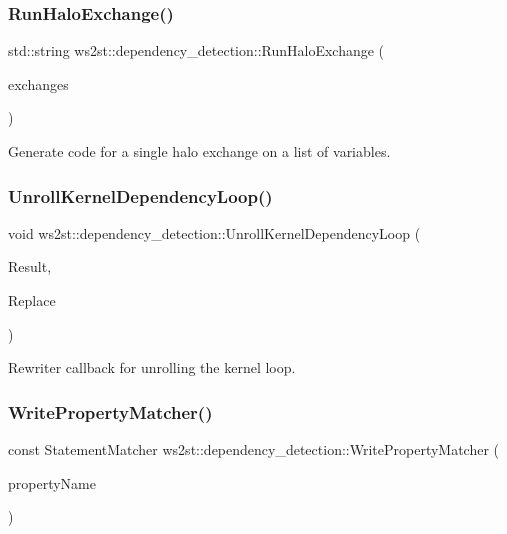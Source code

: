 \subsubsection{\texorpdfstring{Run\+Halo\+Exchange()}{RunHaloExchange()}}
{\footnotesize\ttfamily std\+::string ws2st\+::dependency\+\_\+detection\+::\+Run\+Halo\+Exchange (\begin{DoxyParamCaption}\item[{std\+::vector$<$ std\+::string $>$}]{exchanges }\end{DoxyParamCaption})}



Generate code for a single halo exchange on a list of variables. 

\mbox{\label{namespacews2st_1_1dependency__detection_a8b77ddddfc773081dd720230552c93c2}} 
\subsubsection{\texorpdfstring{Unroll\+Kernel\+Dependency\+Loop()}{UnrollKernelDependencyLoop()}}
{\footnotesize\ttfamily void ws2st\+::dependency\+\_\+detection\+::\+Unroll\+Kernel\+Dependency\+Loop (\begin{DoxyParamCaption}\item[{const Match\+Finder\+::\+Match\+Result \&}]{Result,  }\item[{Replacements \&}]{Replace }\end{DoxyParamCaption})}



Rewriter callback for unrolling the kernel loop. 

\mbox{\label{namespacews2st_1_1dependency__detection_a0d8350273a214bbd4586dedadf37ab83}} 
\subsubsection{\texorpdfstring{Write\+Property\+Matcher()}{WritePropertyMatcher()}}
{\footnotesize\ttfamily const Statement\+Matcher ws2st\+::dependency\+\_\+detection\+::\+Write\+Property\+Matcher (\begin{DoxyParamCaption}\item[{const std\+::string}]{property\+Name }\end{DoxyParamCaption})}



